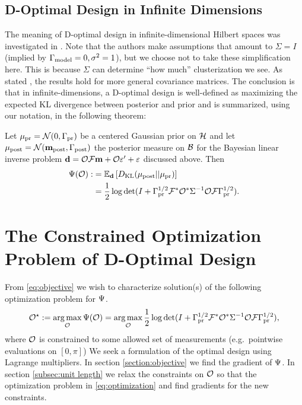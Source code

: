 \documentclass{amsart}
\numberwithin{equation}{section}
\begin{document}
\subsection{D-Optimal Design in Infinite Dimensions}\label{subsec:D optimal design} 
The meaning of D-optimal design in infinite-dimensional Hilbert spaces
was investigated in \cite{AlexanderianGloorGhattas14}. Note that the
authors make assumptions that amount to $\Sigma=I$ (implied by
$\Gamma_{\textup{model}} = 0,\sigma^2=1$), but we choose not to take these
simplification here. This is because $\Sigma$ can determine ``how
much'' clusterization we see. As stated
\cite[pp. 681]{AlexanderianGloorGhattas14}, the results hold for more
general covariance matrices. The conclusion is that in
infinite-dimensions, a D-optimal design is well-defined as maximizing
the expected KL divergence between posterior and prior and is
summarized, using our notation, in the following theorem:
\begin{theorem}
  Let $\mu_{\textup{pr}} = \mathcal{N}(0,\Gamma_{\textup{pr}})$ be a centered Gaussian prior
  on $\mathcal{H}$   and let $\mu_{\textup{post}} = \mathcal{N}(\mathbf{m}_{\textup{post}},\Gamma_{\textup{post}})$ 
  the posterior measure on $\mathcal{B}$ for the Bayesian linear
  inverse problem $\mathbf{d} =  \mathcal{O} \mathcal{F}\mathbf{m} + \mathcal{O} \varepsilon' + \varepsilon$ discussed
  above. Then 
  \begin{align}\label{eq:objective}
    \begin{split}
      \Psi( \mathcal{O}) :&= \mathbb{E}_{\mathbf{d}}\left [ D_{\text{KL}} (\mu_{\textup{post}} || \mu_{\textup{pr}} ) \right ] \\
      &= \frac12 \log \det 
      ( I + \Gamma_{\textup{pr}}^{1/2}  \mathcal{F} ^* \mathcal{O}^* \Sigma^{-1} \mathcal{O} \mathcal{F} \Gamma_{\textup{pr}}^{1/2}).
    \end{split}
  \end{align}
\end{theorem}


\section{The Constrained Optimization Problem of D-Optimal Design}\label{section:D and grad}
From \eqref{eq:objective} we wish to characterize solution(s) of the
following optimization problem for $\Psi$. %
\begin{align}\label{eq:optimization}
  \mathcal{O}^{\star} := \operatorname*{arg\,max}_{\mathcal{O}} \Psi( \mathcal{O} ) 
  = \operatorname*{arg\,max}_{\mathcal{O}} \frac12 \log \det 
  (I + \Gamma_{\textup{pr}}^{1/2} \mathcal{F}^*\mathcal{O}^* \Sigma^{-1} \mathcal{O} \mathcal{F} \Gamma_{\textup{pr}}^{1/2}),
\end{align}
where $\mathcal{O}$ is constrained to some allowed set of measurements
(e.g.\ pointwise evaluations on $[0,\pi]$)
We seek a formulation of the optimal design using Lagrange
multipliers. In section \ref{section:objective} we find the gradient
of $\Psi$.  In section \ref{subsec:unit length} we relax the
constraints on $\mathcal{O}$ so that the optimization problem in
\eqref{eq:optimization} and find gradients for the new constraints.
\end{document}
